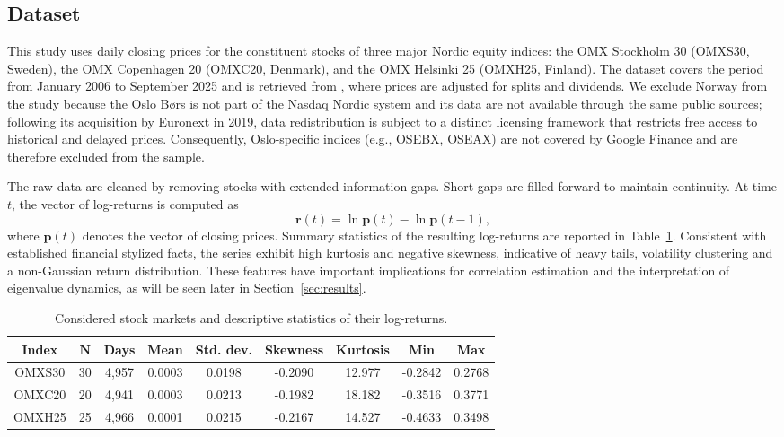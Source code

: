 \documentclass[pdflatex,sn-basic]{sn-jnl}%
\theoremstyle{thmstyleone}%
\theoremstyle{thmstyletwo}%
\theoremstyle{thmstylethree}%
\newcommand{\br}{\boldsymbol{r}}
\newcommand{\bp}{\boldsymbol{p}}
\begin{document}
\subsection{Dataset}
This study uses daily closing prices for the constituent stocks of three major
Nordic equity indices: the OMX Stockholm 30 (OMXS30, Sweden), the OMX Copenhagen
20 (OMXC20, Denmark), and the OMX Helsinki 25 (OMXH25, Finland).  The dataset
covers the period from January 2006 to September 2025 and is retrieved from
\citet{GoogleFinance2025}, where prices are adjusted for splits and dividends.  We
exclude Norway from the study because the Oslo B{\o}rs is not part of the Nasdaq Nordic system
and its data are not available through the same public sources; following its
acquisition by Euronext in 2019, data redistribution is subject to a distinct
licensing framework that restricts free access to historical and delayed
prices. Consequently, Oslo-specific indices (e.g., OSEBX, OSEAX) are not
covered by Google Finance and are therefore excluded from the sample.

The raw data are cleaned by removing stocks with extended information gaps. 
Short gaps are filled forward to maintain continuity. At time $t$, the vector of 
log-returns is computed as
\begin{equation}
\label{eqn:log_returns}
    \br(t)=\ln \bp(t)-\ln \bp(t-1),
\end{equation}
where $\bp(t)$ denotes the vector of closing prices. Summary
statistics of the resulting log-returns are reported in Table~\ref{tab:summary_data}.  
Consistent with established financial stylized facts, the series exhibit high 
kurtosis and negative skewness, indicative of heavy tails, volatility clustering 
and a non-Gaussian return distribution. These features have important implications 
for correlation estimation and the interpretation of eigenvalue dynamics, as will be 
seen later in Section~\ref{sec:results}.

\begin{table}
    \centering
    \caption{Considered stock markets and descriptive statistics of their log-returns.}
    \label{tab:summary_data}
    \begin{tabular}{ccccccccc}
        \hline
    \textbf{Index}  & $\boldsymbol{N}$   & \textbf{Days} &    \textbf{Mean}     & \textbf{Std. dev.} &     \textbf{Skewness}  &  \textbf{Kurtosis}   &   \textbf{Min}    &     \textbf{Max}  \\
        \hline
    {OMXS30} & 30       & 4,957     &  0.0003  &  0.0198  &  -0.2090   &  12.977    &  -0.2842      &  0.2768 \\
    {OMXC20} & 20       & 4,941     &  0.0003  &  0.0213  &  -0.1982   &  18.182    &   -0.3516     &  0.3771 \\
    {OMXH25} & 25       & 4,966     &  0.0001  &  0.0215  &  -0.2167   &  14.527    &   -0.4633     &   0.3498 \\
        \hline
    \end{tabular}
\end{table}
\end{document}
